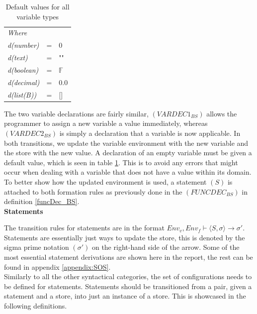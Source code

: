\begin{table}[H]
\centering
\begin{tabular}{lll}
\textit{Where} & & \\
\textit{d(number)}  & = & 0      \\
\textit{d(text)}    & = & ""     \\
\textit{d(boolean)} & = & $\mathbb{F}$ \\
\textit{d(decimal)} & = & 0.0    \\
\textit{d(list(B))} & = & {[}{]}
\end{tabular}
\caption{Default values for all variable types}
\label{tab:defaultTypeValues}
\end{table}

\noindent The two variable declarations are fairly similar, $(VARDEC1_{BS})$ allows the programmer to assign a new variable a value immediately, whereas $(VARDEC2_{BS})$ is simply a declaration that a variable is now applicable. In both transitions, we update the variable environment with the new variable and the store with the new value. A declaration of an empty variable must be given a default value, which is seen in table \ref{tab:defaultTypeValues}. This is to avoid any errors that might occur when dealing with a variable that does not have a value within its domain. To better show how the updated environment is used, a statement $(S)$ is attached to both formation rules as previously done in the $(FUNCDEC_{BS})$ in definition \ref{funcDec_BS}. \\

\noindent \textbf{Statements}

\noindent The transition rules for statements are in the format $Env_v, Env_f \vdash \langle S, \sigma \rangle \rightarrow  \sigma '$.  Statements are essentially just ways to update the store, this is denoted by the sigma prime notation $(\sigma')$ on the right-hand side of the arrow. Some of the most essential statement derivations are shown here in the report, the rest can be found in appendix \ref{appendix:SOS}. \\

Similarly to all the other syntactical categories, the set of configurations needs to be defined for statements. Statements should be transitioned from a pair, given a statement and a store, into just an instance of a store. This is showcased in the following definitions. \\

